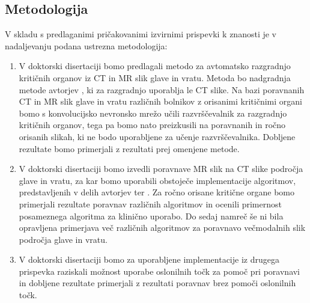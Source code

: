 \documentclass[a4paper,twoside,11pt]{article}
\begin{document}
	\subsection{Metodologija}
	\par{\noindent
		V skladu s predlaganimi pričakovanimi izvirnimi prispevki k znanosti je v nadaljevanju podana ustrezna metodologija:
		\begin{enumerate}
			\item V doktorski disertaciji bomo predlagali metodo za avtomatsko razgradnjo kritičnih organov iz CT in MR slik glave in vratu. Metoda bo nadgradnja metode avtorjev \cite{ibragimov2017}, ki za razgradnjo uporablja le CT slike. Na bazi poravnanih CT in MR slik glave in vratu različnih bolnikov z orisanimi kritičnimi organi bomo s konvolucijsko nevronsko mrežo učili razvrščevalnik za razgradnjo kritičnih organov, tega pa bomo nato preizkusili na poravnanih in ročno orisanih slikah, ki ne bodo uporabljene za učenje razvrščevalnika. Dobljene rezultate bomo primerjali z rezultati prej omenjene metode.
			
			\item V doktorski disertaciji bomo izvedli poravnave MR slik na CT slike področja glave in vratu, za kar bomo uporabili obstoječe implementacije algoritmov, predstavljenih v delih avtorjev \cite{klein2010, avants2008} ter \cite{modat2010}. Za ročno orisane kritične organe bomo primerjali rezultate poravnav različnih algoritmov in ocenili primernost posameznega algoritma za klinično uporabo. Do sedaj namreč še ni bila opravljena primerjava več različnih algoritmov za poravnavo večmodalnih slik področja glave in vratu.
			
			\item V doktorski disertaciji bomo za uporabljene implementacije iz drugega prispevka raziskali možnost uporabe oslonilnih točk za pomoč pri poravnavi in dobljene rezultate primerjali z rezultati poravnav brez pomoči oslonilnih točk.
			
		\end{enumerate}
	}
	\renewcommand{\bibsection}{\subsection{Izbrana literatura}}
	
	\newpage
	\newpage
\end{document}

